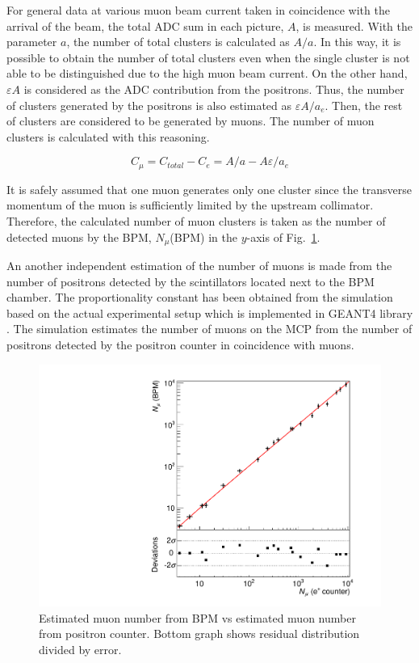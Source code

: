 \documentclass[preprint,3p,twocolumn]{elsarticle}
\begin{document}
For general data at various muon beam current taken in coincidence with the arrival of the beam, the total ADC sum in each picture, $A$, is measured. With the parameter $a$, the number of total clusters is calculated as $A/a$. In this way, it is possible to obtain the number of total clusters even when the single cluster is not able to be distinguished due to the high muon beam current. On the other hand, $\varepsilon A$ is considered as the ADC contribution from the positrons. Thus, the number of clusters generated by the positrons is also estimated as $\varepsilon A/a_e$. Then, the rest of clusters are considered to be generated by muons. The number of muon clusters is calculated with this reasoning.
\begin{linenomath}
\begin{equation}
C_{\mu} = C_{total} - C_{e}= A/a - A\varepsilon/a_e
\end{equation}
\end{linenomath}

It is safely assumed that one muon generates only one cluster since the transverse momentum of the muon is sufficiently limited by the upstream collimator. Therefore, the calculated number of muon clusters is taken as the number of detected muons by the BPM, $N_{\mu}$(BPM) in the $y$-axis of Fig.~\ref{fig:muvsmu}.

An another independent estimation of the number of muons is made from the number of positrons detected by the scintillators located next to the BPM chamber. The proportionality constant has been obtained from the simulation based on the actual experimental setup which is implemented in GEANT4 library \cite{geant4}. 
The simulation estimates the number of muons on the MCP from the number of positrons detected by the positron counter in coincidence with muons. 
\begin{figure}[tbp]
	\centering
	\includegraphics[width=\columnwidth]{figure/lin.pdf}
\caption{Estimated muon number from BPM vs estimated muon number from positron counter. 
Bottom graph shows residual distribution divided by error.}
\label{fig:muvsmu}
\end{figure}
\end{document}
